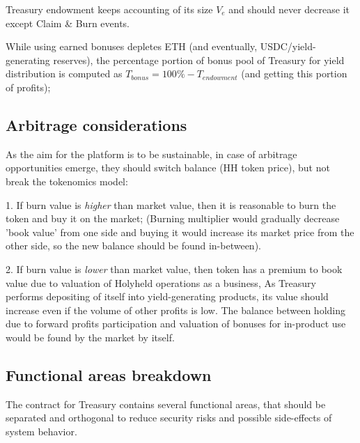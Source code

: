 \documentclass[12pt]{article}
\begin{document}
Treasury endowment keeps accounting of its size $V_{e}$ and should never decrease it except Claim \& Burn events.

While using earned bonuses depletes ETH (and eventually, USDC/yield-generating reserves), the percentage portion of bonus pool of Treasury for yield distribution is computed as $T_{\mathit{bonus}} = 100\% - T_{\mathit{endowment}}$ (and getting this portion of profits);



\subsection{Arbitrage considerations}

As the aim for the platform is to be sustainable, in case of arbitrage opportunities emerge, they should switch balance (HH token price), but not break the tokenomics model:

1. If burn value is \emph{higher} than market value, then it is reasonable to burn the token and buy it on the market;
(Burning multiplier would gradually decrease 'book value' from one side and buying it would increase its market price from the other side, so the new balance should be found in-between).

2. If burn value is \emph{lower} than market value, then token has a premium to book value due to valuation of Holyheld operations as a business, As Treasury performs depositing of itself into yield-generating products, its value should increase even if the volume of other profits is low. The balance between holding due to forward profits participation and valuation of bonuses for in-product use would be found by the market by itself.


\subsection{Functional areas breakdown}

The contract for Treasury contains several functional areas, that should be separated and orthogonal \cite{wiki_orthogonal} to reduce security risks and possible side-effects of system behavior.
\end{document}
